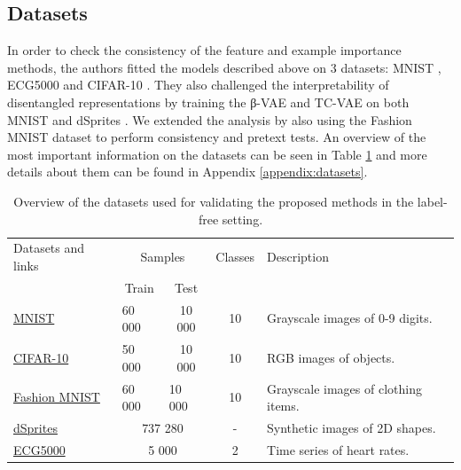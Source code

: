 \subsection{Datasets}

In order to check the consistency of the feature and example importance methods, the authors fitted the models described above on 3 datasets: MNIST \citep{mnist}, ECG5000 \citep{ecg} and CIFAR-10 \citep{cifar10}. They also challenged the interpretability of disentangled representations by training the β-VAE and TC-VAE on both MNIST and dSprites \citep{dsprites}. We extended the analysis by also using the Fashion MNIST dataset \citep{fashion} to perform consistency and pretext tests. An overview of the most important information on the datasets can be seen in Table \ref{table-datasets} and more details about them can be found in Appendix \ref{appendix:datasets}.




\begin{table}[H]
\begin{tabular}{lcccl}
\hline
Datasets and links & \multicolumn{2}{c}{Samples}                             & \multicolumn{1}{l}{Classes} & Description                         \\ \cline{2-3}
                   & Train                      & Test                       & \multicolumn{1}{l}{}        &                                     \\ \hline
\href{http://yann.lecun.com/exdb/mnist/}{MNIST}              & \multicolumn{1}{l}{60 000} & 10 000                     & 10                          & Grayscale images of 0-9 digits.     \\
\href{https://www.cs.toronto.edu/~kriz/cifar.html}{CIFAR-10}           & \multicolumn{1}{l}{50 000} & 10 000                     & 10                          & RGB images of objects.              \\
\href{https://github.com/zalandoresearch/fashion-mnist}{Fashion MNIST}      & \multicolumn{1}{l}{60 000} & \multicolumn{1}{l}{10 000} & 10                          & Grayscale images of clothing items. \\
\href{https://github.com/deepmind/dsprites-dataset}{dSprites}           & \multicolumn{2}{c}{737 280}                             & -                           & Synthetic images of 2D shapes.      \\
\href{http://www.timeseriesclassification.com/description.php?Dataset=ECG5000}{ECG5000}            & \multicolumn{2}{c}{5 000}                               & 2                           & Time series of heart rates.         \\ \hline
\end{tabular}
\caption{\label{table-datasets}Overview of the datasets used for validating the proposed methods in the label-free setting.}
\end{table}

